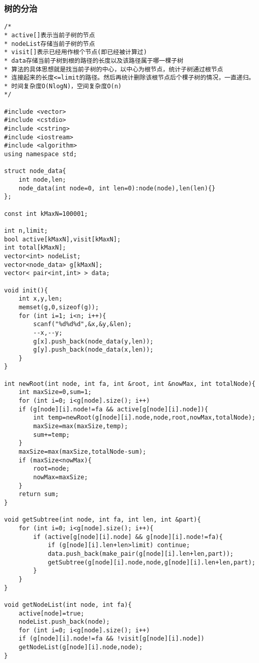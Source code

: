 \subsubsection{树的分治}
\begin{verbatim}
/*
* active[]表示当前子树的节点
* nodeList存储当前子树的节点
* visit[]表示已经用作根个节点(即已经被计算过)
* data存储当前子树到根的路径的长度以及该路径属于哪一棵子树
* 算法的具体思想就是找当前子树的中心，以中心为根节点，统计子树通过根节点
* 连接起来的长度<=limit的路径。然后再统计删除该根节点后个棵子树的情况，一直递归。
* 时间复杂度O(NlogN)，空间复杂度O(n)
*/

#include <vector>
#include <cstdio>
#include <cstring>
#include <iostream>
#include <algorithm>
using namespace std;

struct node_data{
    int node,len;
    node_data(int node=0, int len=0):node(node),len(len){}
};

const int kMaxN=100001;

int n,limit;
bool active[kMaxN],visit[kMaxN];
int total[kMaxN];
vector<int> nodeList;
vector<node_data> g[kMaxN];
vector< pair<int,int> > data;

void init(){
    int x,y,len;
    memset(g,0,sizeof(g));
    for (int i=1; i<n; i++){
        scanf("%d%d%d",&x,&y,&len);
        --x,--y;
        g[x].push_back(node_data(y,len));
        g[y].push_back(node_data(x,len));
    }
}

int newRoot(int node, int fa, int &root, int &nowMax, int totalNode){
    int maxSize=0,sum=1;
    for (int i=0; i<g[node].size(); i++)
    if (g[node][i].node!=fa && active[g[node][i].node]){
        int temp=newRoot(g[node][i].node,node,root,nowMax,totalNode);
        maxSize=max(maxSize,temp);
        sum+=temp;
    }
    maxSize=max(maxSize,totalNode-sum);
    if (maxSize<nowMax){
        root=node;
        nowMax=maxSize;
    }
    return sum;
}

void getSubtree(int node, int fa, int len, int &part){
    for (int i=0; i<g[node].size(); i++){
        if (active[g[node][i].node] && g[node][i].node!=fa){
            if (g[node][i].len+len>limit) continue;
            data.push_back(make_pair(g[node][i].len+len,part));
            getSubtree(g[node][i].node,node,g[node][i].len+len,part);
        }
    }
}

void getNodeList(int node, int fa){
    active[node]=true;
    nodeList.push_back(node);
    for (int i=0; i<g[node].size(); i++)
    if (g[node][i].node!=fa && !visit[g[node][i].node])
    getNodeList(g[node][i].node,node);
}


\end{verbatim}
